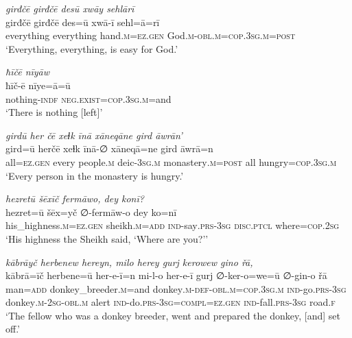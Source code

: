 \ea \label{ZQ.56}
\textit{girđčē girđčē desū xwāy sehlārī} \\ 
\gll girđčē girđčē des=ū xwā-ī sehl=ā=rī \\ 
 everything everything hand\textsc{.m}\textsc{=ez.gen} God\textsc{.m}\textsc{-obl}\textsc{.m}\textsc{=cop}\textsc{.3sg}\textsc{.m}\textsc{=\textsc{post}} \\ 
\glt `Everything, everything, is easy for God.'
\z 
 

\ea \label{HB.4}
\textit{ħīčē nīyāw} \\ 
\gll ħīč-ē nīye=ā=ū \\ 
 nothing\textsc{-indf} \textsc{\textsc{neg.}exist}\textsc{=cop}\textsc{.3sg}\textsc{.m}=and \\ 
\glt `There is nothing [left]'
\z 
 
\ea \label{HB.5}
\textit{girdū her čē xeɫk īnā xāneqāne gird āwrān’} \\ 
\gll gird=ū herčē xeɫk īnā-∅ xāneqā=ne gird āwrā=n \\ 
 all\textsc{=ez}\textsc{.gen} every people\textsc{.m} deic\textsc{-3sg}\textsc{.m} monastery\textsc{.m}\textsc{=\textsc{post}} all hungry\textsc{=cop}\textsc{.3sg}\textsc{.m} \\ 
\glt `Every person in the monastery is hungry.'
\z 
 
\ea \label{HB.6}
\textit{hezretū šēxīč fermāwo, dey konī?} \\ 
\gll hezret=ū šēx=yč ∅-fermāw-o dey ko=nī \\ 
 his\_highness\textsc{.m}\textsc{=ez}\textsc{.gen} sheikh\textsc{.m}\textsc{=add} \textsc{ind-}say\textsc{.prs}\textsc{-3sg} \textsc{disc.ptcl} where\textsc{=cop}\textsc{.\textsc{2sg}} \\ 
\glt `His highness the Sheikh said, ‘Where are you?’'
\z 
 
\ea \label{HB.15}
\textit{kābrāyč herbenew hereyn, milo herey gurj kerowew gino řā,} \\ 
\gll kābrā=īč herbene=ū her-e-ī=n mi-l-o her-e-ī gurj ∅-ker-o=we=ū ∅-gin-o řā \\ 
 man\textsc{=add} donkey\_breeder\textsc{.m}=and donkey\textsc{.m}\textsc{-def}\textsc{-obl}\textsc{.m}\textsc{=cop}\textsc{.3sg}\textsc{.m} \textsc{ind-}go\textsc{.prs}\textsc{-3sg} donkey\textsc{.m}-\textsc{2sg}\textsc{-obl}\textsc{.m} alert \textsc{ind-}do\textsc{.prs}\textsc{-3sg}\textsc{=\textsc{compl}}\textsc{=ez}\textsc{.gen} \textsc{ind-}fall\textsc{.prs}\textsc{-3sg} road\textsc{\textsc{.f}} \\ 
\glt `The fellow who was a donkey breeder, went and prepared the donkey, [and] set off.'
\z 
 
